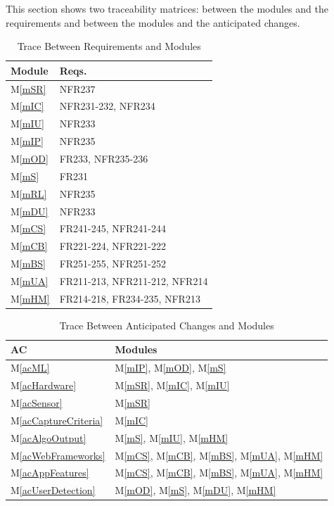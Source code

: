 \documentclass[12pt, titlepage]{article}
\newcommand{\mref}[1]{M\ref{#1}}
\begin{document}
This section shows two traceability matrices: between the modules and the
requirements and between the modules and the anticipated changes.

\begin{table}[H]
\centering
\begin{tabular}{p{} p{}}
\toprule
\textbf{Module} & \textbf{Reqs.}\\
\midrule
\mref{mSR} & NFR237\\
\mref{mIC} & NFR231-232, NFR234\\
\mref{mIU} & NFR233\\
\mref{mIP} & NFR235\\
\mref{mOD} & FR233, NFR235-236\\
\mref{mS} & FR231\\
\mref{mRL} & NFR235\\
\mref{mDU} & NFR233\\
\mref{mCS} & FR241-245, NFR241-244\\
\mref{mCB} & FR221-224, NFR221-222\\
\mref{mBS} & FR251-255, NFR251-252\\
\mref{mUA} & FR211-213, NFR211-212, NFR214 \\
\mref{mHM} & FR214-218, FR234-235, NFR213 \\

\bottomrule
\end{tabular}
\caption{Trace Between Requirements and Modules}
\label{TblRT}
\end{table}

\begin{table}[H]
\centering
\begin{tabular}{p{} p{}}
\toprule
\textbf{AC} & \textbf{Modules}\\
\midrule
\mref{acML} & \mref{mIP}, \mref{mOD}, \mref{mS} \\
\mref{acHardware} & \mref{mSR}, \mref{mIC}, \mref{mIU} \\
\mref{acSensor} & \mref{mSR} \\
\mref{acCaptureCriteria} & \mref{mIC} \\
\mref{acAlgoOutput} & \mref{mS}, \mref{mIU}, \mref{mHM} \\
\mref{acWebFrameworks} & \mref{mCS}, \mref{mCB}, \mref{mBS}, \mref{mUA}, \mref{mHM} \\
\mref{acAppFeatures} & \mref{mCS}, \mref{mCB}, \mref{mBS}, \mref{mUA}, \mref{mHM} \\
\mref{acUserDetection} & \mref{mOD}, \mref{mS}, \mref{mDU}, \mref{mHM} \\
\bottomrule
\end{tabular}
\caption{Trace Between Anticipated Changes and Modules}
\label{TblACT}
\end{table}
\end{document}
